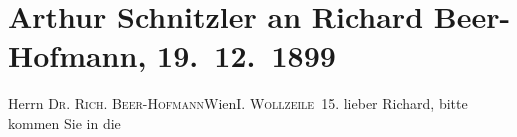 

         
         \newcommand{\erwaehntePersonen}{Personen: Richard Beer-Hofmann, Franz Grillparzer, Gisela Hajek, Paul Schlenther}
         \newcommand{\erwaehnteInstitutionen}{Institutionen: Burgtheater}
         \newcommand{\erwaehnteOrte}{Orte: Burgtheater, I., Innere Stadt, Wien, Wollzeile}
         \newcommand{\erwaehnteWerke}{Werke: Die Gefährtin. Schauspiel in einem Akt, Esther, Paracelsus. Versspiel in einem Akt}
               \section[Arthur Schnitzler an Richard Beer-Hofmann, 19. 12. 1899]{ Arthur Schnitzler an Richard Beer-Hofmann, 19. 12. 1899}\nopagebreak{}\rehead{ }\begin{ledgroupsized}[t]{13cm}\normalsize\beginnumbering \toendnotes[C]{\smallbreak\pagebreak[2]} 
\toendnotes[C]{\smallbreak}\pstart{}{\pb}Herrn \textsc{Dr. Rich.
                     Beer-Hofmann}\pend{}\pstart{}Wien\pend{}\pstart{}\textsc{I. Wollzeile 15}.\pend{}{\bigskip}\pstart
           \noindent{}{\pb}lieber Richard, bitte kommen Sie in die \label{K_L01006_1v}
\end{ledgroupsized}
